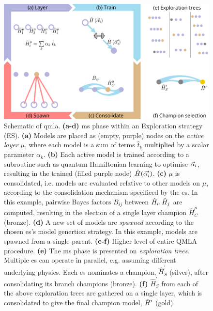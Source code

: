 \begin{figure}[t!]
    \includegraphics[width=\textwidth]{figure_development/overview_loop.pdf}
    \caption[Quantum Model Learning Agent overview]{
        Schematic of \acrfull{qmla}. 
        \textbf{(a-d)} \gls{ms} phase within an Exploration strategy (ES).
        \textbf{(a)} Models are placed as (empty, purple) nodes on the \emph{active layer} $\mu$, 
            where each model is a sum of terms $\hat{t}_k$ multiplied by a scalar parameter $\alpha_k$. 
        \textbf{(b)} Each active model is trained according to a subroutine such as 
            quantum Hamiltonian learning to optimise $\vec{\alpha}_i$, 
            resulting in the trained (filled purple node) $\hat{H}(\vec{\alpha}_i^{\prime})$. 
        \textbf{(c)} $\mu$ is consolidated, i.e. models are evaluated relative to other
            models on $\mu$, according to the consolidation mechanism specificed by the \gls{es}.
            In this example, pairwise Bayes factors $B_{ij}$ between $\hat{H}_i, \hat{H}_j$ are computed, 
            resulting in the election of a single layer champion $\hat{H}_C^{\mu}$ (bronze). 
        \textbf{(d)} A new set of models are \emph{spawned} according to the chosen
            \gls{es}'s model genertion strategy.
            In this example, models are spawned from a single parent. 
        \textbf{(e-f)} Higher level of entire QMLA procedure.
        \textbf{(e)} The \gls{ms} phase is presented on \emph{exploration trees}. 
            Multiple \gls{es} can operate in parallel, e.g. assuming different underlying physics.
            Each \gls{es} nominates a champion, $\hat{H}_{S}^{\prime}$ (silver), 
            after consolidating its branch champions (bronze). 
        \textbf{(f)} $\hat{H}_{S}^{\prime}$ from each of the above exploration trees are gathered on a single layer, 
            which is consolidated to give the final champion model, $\hat{H}^{\prime}$ (gold). 
    }
    \label{fig:qmla_overview}
\end{figure}

